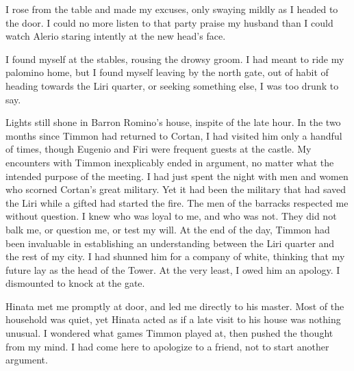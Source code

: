 \documentclass{article}
\begin{document}
I rose from the table and made my excuses, only swaying mildly as I headed to the door. I could no more listen to that party praise my husband than I could watch Alerio staring intently at the new head's face.

I found myself at the stables, rousing the drowsy groom. I had meant to ride my palomino home, but I found myself leaving by the north gate, out of habit of heading towards the Liri quarter, or seeking something else, I was too drunk to say. 

Lights still shone in Barron Romino's house, inspite of the late hour. In the two months since Timmon had returned to Cortan, I had visited him only a handful of times, though Eugenio and Firi were frequent guests at the castle. My encounters with Timmon inexplicably ended in argument, no matter what the intended purpose of the meeting. I had just spent the night with men and women who scorned Cortan's great military. Yet it had been the military that had saved the Liri while a gifted had started the fire. The men of the barracks respected me without question. I knew who was loyal to me, and who was not. They did not balk me, or question me, or test my will. At the end of the day, Timmon had been invaluable in establishing an understanding between the Liri quarter and the rest of my city. I had shunned him for a company of white, thinking that my future lay as the head of the Tower. At the very least, I owed him an apology. I dismounted to knock at the gate. 

Hinata met me promptly at door, and led me directly to his master. Most of the household was quiet, yet Hinata acted as if a late visit to his house was nothing unusual. I wondered what games Timmon played at, then pushed the thought from my mind. I had come here to apologize to a friend, not to start another argument.

\vspace{.5cm}
\end{document}
